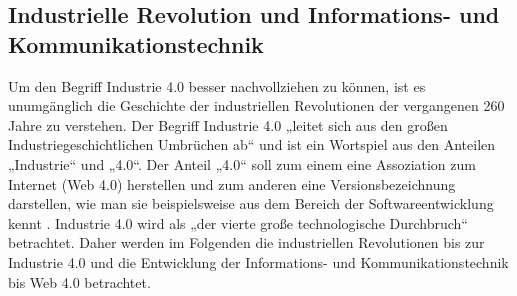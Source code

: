 \subsection{Industrielle Revolution und Informations- und Kommunikationstechnik}\label{sec:GeschichteIndustrie4}
Um den Begriff Industrie 4.0 besser nachvollziehen zu können, ist es unumgänglich die Geschichte der industriellen Revolutionen der vergangenen 260 Jahre zu verstehen. Der Begriff Industrie 4.0 „leitet sich aus den großen Industriegeschichtlichen Umbrüchen ab“ \cite{7} und ist ein Wortspiel aus den Anteilen „Industrie“ und „4.0“. Der Anteil „4.0“ soll zum einem eine Assoziation zum Internet (Web 4.0) herstellen und zum anderen eine Versionsbezeichnung darstellen, wie man sie beispielsweise aus dem Bereich der Softwareentwicklung kennt \cite{1}.
\newline
Industrie 4.0 wird als „der vierte große technologische Durchbruch“ \cite{7} betrachtet. Daher werden im Folgenden die industriellen Revolutionen bis zur Industrie 4.0 und die Entwicklung der Informations- und Kommunikationstechnik bis Web 4.0 betrachtet.
\newpage

